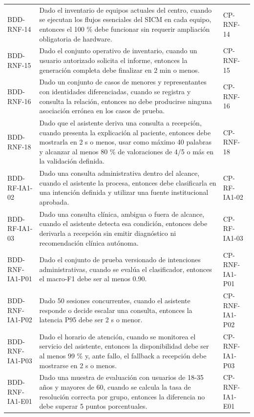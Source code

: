 \documentclass[11pt,a4paper]{article}
\begin{document}
\begin{appendices}
\begin{longtable}{p{2.8cm}p{10.6cm}p{2cm}}
		BDD-RNF-14 & Dado el inventario de equipos actuales del centro, cuando se ejecutan los flujos esenciales del SICM en cada equipo, entonces el 100 \% debe funcionar sin requerir ampliación obligatoria de hardware. & CP-RNF-14\\
		BDD-RNF-15 & Dado el conjunto operativo de inventario, cuando un usuario autorizado solicita el informe, entonces la generación completa debe finalizar en 2 min o menos. & CP-RNF-15\\
		BDD-RNF-16 & Dado un conjunto de casos de menores y representantes con identidades diferenciadas, cuando se registra y consulta la relación, entonces no debe producirse ninguna asociación errónea en los casos de prueba. & CP-RNF-16\\
		BDD-RNF-18 & Dado que el asistente deriva una consulta a recepción, cuando presenta la explicación al paciente, entonces debe mostrarla en 2 s o menos, usar como máximo 40 palabras y alcanzar al menos 80 \% de valoraciones de 4/5 o más en la validación definida. & CP-RNF-18\\
		BDD-RF-IA1-02 & Dado una consulta administrativa dentro del alcance, cuando el asistente la procesa, entonces debe clasificarla en una intención definida y utilizar una fuente institucional aprobada. & CP-RF-IA1-02\\
		BDD-RF-IA1-03 & Dado una consulta clínica, ambigua o fuera de alcance, cuando el asistente detecta esa condición, entonces debe derivarla a recepción sin emitir diagnóstico ni recomendación clínica autónoma. & CP-RF-IA1-03\\
		BDD-RNF-IA1-P01 & Dado el conjunto de prueba versionado de intenciones administrativas, cuando se evalúa el clasificador, entonces el macro-F1 debe ser al menos 0.90. & CP-RNF-IA1-P01\\
		BDD-RNF-IA1-P02 & Dado 50 sesiones concurrentes, cuando el asistente responde o decide escalar una consulta, entonces la latencia P95 debe ser 2 s o menor. & CP-RNF-IA1-P02\\
		BDD-RNF-IA1-P03 & Dado el horario de atención, cuando se monitorea el servicio del asistente, entonces la disponibilidad debe ser al menos 99 \% y, ante fallo, el fallback a recepción debe mostrarse en 2 s o menos. & CP-RNF-IA1-P03\\
		BDD-RNF-IA1-E01 & Dado una muestra de evaluación con usuarios de 18-35 años y mayores de 60, cuando se calcula la tasa de resolución correcta por grupo, entonces la diferencia no debe superar 5 puntos porcentuales. & CP-RNF-IA1-E01\\

\end{longtable}
\end{appendices}
\end{document}
